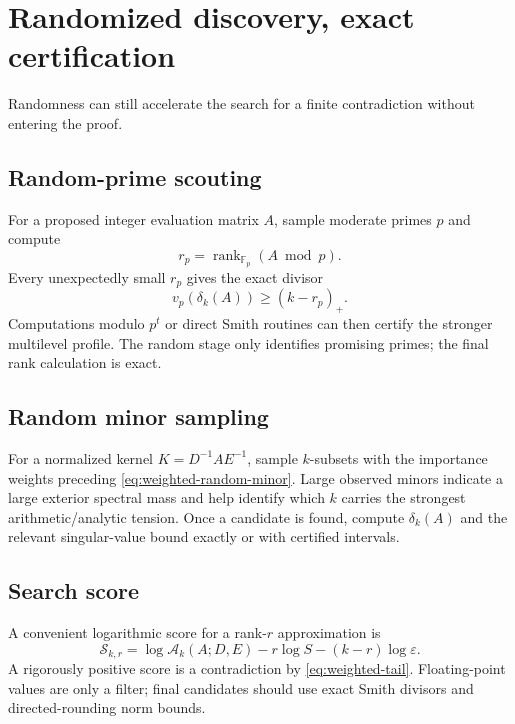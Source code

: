 \documentclass[11pt,oneside]{article}
\theoremstyle{definition}
\theoremstyle{remark}
\newcommand{\F}{\mathbb{F}}
\newcommand{\rank}{\operatorname{rank}}
\newcommand{\eps}{\varepsilon}
\begin{document}
\section{Randomized discovery, exact certification}
\label{sec:random-search}

Randomness can still accelerate the search for a finite contradiction without entering the proof.

\subsection{Random-prime scouting}

For a proposed integer evaluation matrix $A$, sample moderate primes $p$ and compute
\[
 r_p=\rank_{\F_p}(A\bmod p).
\]
Every unexpectedly small $r_p$ gives the exact divisor
\begin{equation}
 v_p(\delta_k(A))\ge(k-r_p)_+.
 \label{eq:rank-one-level}
\end{equation}
Computations modulo $p^t$ or direct Smith routines can then certify the stronger multilevel profile.  The random stage only identifies promising primes; the final rank calculation is exact.

\subsection{Random minor sampling}

For a normalized kernel $K=D^{-1}AE^{-1}$, sample $k$-subsets with the importance weights preceding \eqref{eq:weighted-random-minor}.  Large observed minors indicate a large exterior spectral mass and help identify which $k$ carries the strongest arithmetic/analytic tension.  Once a candidate is found, compute $\delta_k(A)$ and the relevant singular-value bound exactly or with certified intervals.

\subsection{Search score}

A convenient logarithmic score for a rank-$r$ approximation is
\begin{equation}
 \mathcal S_{k,r}
 =\log\mathcal A_k(A;D,E)-r\log S-(k-r)\log\eps.
 \label{eq:search-score}
\end{equation}
A rigorously positive score is a contradiction by \eqref{eq:weighted-tail}.  Floating-point values are only a filter; final candidates should use exact Smith divisors and directed-rounding norm bounds.
\end{document}
